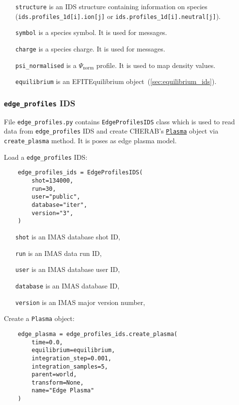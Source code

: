 \documentclass[../../main.tex]{subfiles}
\begin{document}
\begin{itemize}[align=left]
    \item[\texttt{structure}] is an IDS structure containing information on species (\texttt{ids.profiles\_1d[i].ion[j]} or \texttt{ids.profiles\_1d[i].neutral[j]}).
    \item[\texttt{symbol}] is a species symbol. It is used for messages.
    \item[\texttt{charge}] is a species charge. It is used for messages.
    \item[\texttt{psi\_normalised}] is a $\Psi_\text{norm}$ profile. It is used to map density values.
    \item[\texttt{equilibrium}] is an EFITEquilibrium object~(\cref{sec:equilibrium_ids}).
\end{itemize}

\subsubsection{\texttt{edge\_profiles} IDS}%
\label{sec:edge_profiles_ids}

File \texttt{edge\_profiles.py} contains \texttt{EdgeProfilesIDS} class which is used to read data from \texttt{edge\_profiles} IDS and create CHERAB's \href{https://cherab.github.io/documentation/plasmas/core_plasma_classes.html?highlight=plasma#cherab.core.Plasma}{\texttt{Plasma}} object via \texttt{create\_plasma} method. It is poses as edge plasma model.

Load a \texttt{edge\_profiles} IDS:
\begin{verbatim}
    edge_profiles_ids = EdgeProfilesIDS(
        shot=134000,
        run=30,
        user="public",
        database="iter",
        version="3",
    )
\end{verbatim}

\begin{itemize}[align=left]
    \item[\texttt{shot}] is an IMAS database shot ID,
    \item[\texttt{run}] is an IMAS data run ID,
    \item[\texttt{user}] is an IMAS database user ID,
    \item[\texttt{database}] is an IMAS database ID,
    \item[\texttt{version}] is an IMAS major version number,
\end{itemize}

Create a \texttt{Plasma} object:
\begin{verbatim}
    edge_plasma = edge_profiles_ids.create_plasma(
        time=0.0,
        equilibrium=equilibrium,
        integration_step=0.001,
        integration_samples=5,
        parent=world,
        transform=None,
        name="Edge Plasma"
    )
\end{verbatim}
\end{document}
